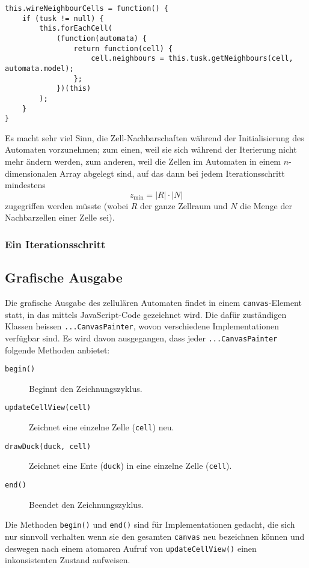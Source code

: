 \documentclass[11pt]{article} %
\theoremstyle{definition}
\begin{document}
\begin{lstlisting}
this.wireNeighbourCells = function() {
	if (tusk != null) {
		this.forEachCell(
			(function(automata) {
				return function(cell) {
					cell.neighbours = this.tusk.getNeighbours(cell, automata.model);
				};
			})(this)
		);
	}
}
\end{lstlisting}

Es macht sehr viel Sinn, die Zell-Nachbarschaften während der Initialisierung des Automaten vorzunehmen; zum einen, weil sie sich während der Iterierung nicht mehr ändern werden, zum anderen, weil die Zellen im Automaten in einem $n$-dimensionalen Array abgelegt sind, auf das dann bei jedem Iterationsschritt mindestens
\[
	z_{\textrm{min}} = |R| \cdot |N|
\]
zugegriffen werden müsste (wobei $R$ der ganze Zellraum und $N$ die Menge der Nachbarzellen einer Zelle sei).

\subsubsection{Ein Iterationsschritt}

\subsection{Grafische Ausgabe}

Die grafische Ausgabe des zellulären Automaten findet in einem {\tt canvas}-Element statt, in das mittels JavaScript-Code gezeichnet wird. Die dafür zuständigen Klassen heissen {\tt ...CanvasPainter}, wovon verschiedene Implementationen verfügbar sind. Es wird davon ausgegangen, dass jeder {\tt ...CanvasPainter} folgende Methoden anbietet:

\begin{description}
\item[\tt begin()] Beginnt den Zeichnungszyklus.
\item[\tt updateCellView(cell)] Zeichnet eine einzelne Zelle ({\tt cell}) neu.
\item[\tt drawDuck(duck, cell)] Zeichnet eine Ente ({\tt duck}) in eine einzelne Zelle ({\tt cell}).
\item[\tt end()] Beendet den Zeichnungszyklus.
\end{description}

Die Methoden {\tt begin()} und {\tt end()} sind für Implementationen gedacht, die sich nur sinnvoll verhalten wenn sie den gesamten {\tt canvas} neu bezeichnen können und deswegen nach einem atomaren Aufruf von {\tt updateCellView()} einen inkonsistenten Zustand aufweisen.
\end{document}
